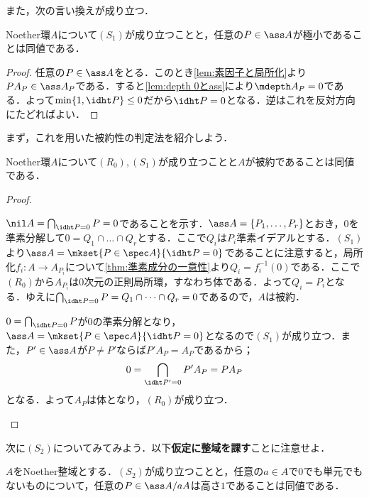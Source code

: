また，次の言い換えが成り立つ．
\begin{lem}
	Noether環$A$について$(S_1)$が成り立つことと，任意の$P\in\ass A$が極小であることは同値である．
\end{lem}

\begin{proof}
	任意の$P\in\ass A$をとる．このとき\ref{lem:素因子と局所化}より$PA_P\in\ass A_P$である．すると\ref{lem:depth 0とass}により$\mdepth A_P=0$である．よって$\min\{1,\idht P\}\leq0$だから$\idht P=0$となる．逆はこれを反対方向にたどればよい．
\end{proof}

まず，これを用いた被約性の判定法を紹介しよう．

\begin{thm}
	Noether環$A$について$(R_0),(S_1)$が成り立つことと$A$が被約であることは同値である．
\end{thm}

\begin{proof}
	\begin{eqv}
		\item $\nil A=\bigcap_{\idht P=0}P=0$であることを示す．$\ass A=\{P_1,\dots,P_r\}$とおき，$0$を準素分解して$0=Q_1\cap\dots\cap Q_r$とする．ここで$Q_i$は$P_i$準素イデアルとする．$(S_1)$より$\ass A=\mkset{P\in\spec A}{\idht P=0}$であることに注意すると，局所化$f_i:A\to A_{P_i}$について\ref{thm:準素成分の一意性}より$Q_i=f_i^{-1}(0)$である．ここで$(R_0)$から$A_{P_i}$は$0$次元の正則局所環，すなわち体である．よって$Q_i=P_i$となる．ゆえに$\bigcap_{\idht P=0}P=Q_1\cap\dots\cap Q_r=0$であるので，$A$は被約． 
		\item $0=\bigcap_{\idht P=0}P$が$0$の準素分解となり，$\ass A=\mkset{P\in\spec A}{\idht P=0}$となるので$(S_1)$が成り立つ．また，$P'\in\ass A$が$P\neq P'$ならば$P'A_P=A_P$であるから；
		\[0=\bigcap_{\idht P'=0}P'A_P=PA_P\]
		となる．よって$A_P$は体となり，$(R_0)$が成り立つ．
	\end{eqv}
\end{proof}

次に$(S_2)$についてみてみよう．以下\textbf{仮定に整域を課す}ことに注意せよ．

\begin{lem}
	$A$をNoether整域とする．$(S_2)$が成り立つことと，任意の$a\in A$で$0$でも単元でもないものについて，任意の$P\in\ass A/aA$は高さ$1$であることは同値である．
\end{lem}

